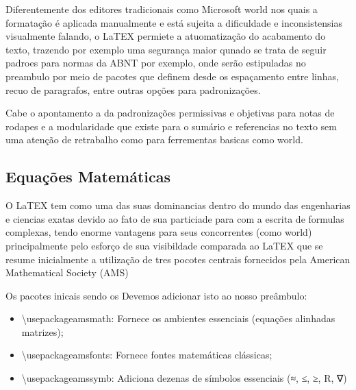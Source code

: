 \documentclass[12pt, a4paper]{article}
\begin{document}
Diferentemente dos editores tradicionais como Microsoft world nos quais a formatação é aplicada manualmente e está sujeita a dificuldade e inconsistensias visualmente falando, o LaTEX permiete a atuomatização do acabamento do texto, trazendo por exemplo uma segurança maior qunado se trata de seguir padroes para normas da ABNT por exemplo, onde serão estipuladas no preambulo por meio de pacotes que definem desde os espaçamento entre linhas, recuo de paragrafos, entre outras opções para padronizações.


Cabe o apontamento a da padronizações permissivas e objetivas para notas de rodapes e a modularidade que existe para o sumário e referencias no texto sem uma atenção de retrabalho como para ferrementas basicas como world.



\subsection{ Equações Matemáticas}





O LaTEX tem como uma das suas dominancias dentro do mundo das engenharias e ciencias exatas devido ao fato de sua particiade para com a escrita de formulas complexas, tendo enorme vantagens para seus concorrentes (como world) principalmente pelo esforço de sua visibildade comparada ao LaTEX que se resume inicialmente a utilização de tres pocotes centrais  fornecidos pela American Mathematical Society (AMS)


Os pacotes inicais sendo os Devemos adicionar isto ao nosso preâmbulo:
\begin{itemize}
    \item \textbackslash usepackage{amsmath}: Fornece os ambientes essenciais (equações alinhadas matrizes);
    \item \textbackslash usepackage{amsfonts}: Fornece fontes matemáticas 
    clássicas;
    \item \textbackslash usepackage{amssymb}: Adiciona dezenas de símbolos essenciais (≈, ≤, ≥, R, ∇)

\end{itemize}
\end{document}
